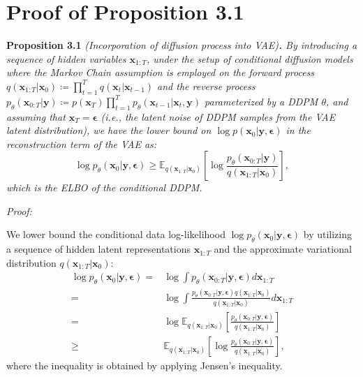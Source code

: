 \section{Proof of Proposition 3.1}
\label{sec: appendix proof prop 1}
\noindent\textbf{Proposition 3.1} 
\textit{
    (Incorporation of diffusion process into VAE)\textbf{.}
    By introducing a sequence of hidden variables $\mathbf{x}_{1:T}$, under the setup of conditional diffusion models where the Markov Chain assumption is employed on the forward process $q(\mathbf{x}_{1:T}|\mathbf{x}_0)\coloneq\prod_{t=1}^Tq(\mathbf{x}_t|\mathbf{x}_{t-1})$ and the reverse process $p_\theta(\mathbf{x}_{0:T}|\mathbf{y})\coloneq p(\mathbf{x}_T)\prod_{t=1}^Tp_\theta(\mathbf{x}_{t-1}|\mathbf{x}_t,\mathbf{y})$ parameterized by a DDPM $\theta$, and assuming that $\mathbf{x}_T=\boldsymbol{\epsilon}$ (i.e., the latent noise of DDPM samples from the VAE latent distribution), we have the lower bound on $\log p(\mathbf{x}_0|\mathbf{y},\boldsymbol{\epsilon})$ in the reconstruction term of the VAE as:
    \begin{equation*}
        \log p_\theta(\mathbf{x}_0|\mathbf{y},\boldsymbol{\epsilon})\geq\mathbb{E}_{q(\mathbf{x}_{1:T}|\mathbf{x}_0)}\left[\log\frac{p_\theta({\mathbf{x}_{0:T}}|\mathbf{y})}{q(\mathbf{x}_{1:T}|\mathbf{x}_0)}\right],
    \end{equation*}
    which is the ELBO of the conditional DDPM. 
}

\vspace{0.25cm}

\textit{Proof:}

We lower bound the conditional data log-likelihood $\log p_\theta(\mathbf{x}_0|\mathbf{y},\boldsymbol{\epsilon})$ by utilizing a sequence of hidden latent representations $\mathbf{x}_{1:T}$ and the approximate variational distribution $q(\mathbf{x}_{1:T}|\mathbf{x}_0)$:
\begin{equation}
\begin{aligned}
    \log p_\theta(\mathbf{x}_0|\mathbf{y},\boldsymbol{\epsilon})=&\log\int p_\theta(\mathbf{x}_{0:T}|\mathbf{y},\boldsymbol{\epsilon})d\mathbf{x}_{1:T} \\
    =&\log\int \frac{p_\theta(\mathbf{x}_{0:T}|\mathbf{y},\boldsymbol{\epsilon})q(\mathbf{x}_{1:T}|\mathbf{x}_0)}{q(\mathbf{x}_{1:T}|\mathbf{x}_0)}d\mathbf{x}_{1:T} \\
    =&\log\mathbb{E}_{q(\mathbf{x}_{1:T}|\mathbf{x}_0)}\left[\frac{p_\theta({\mathbf{x}_{0:T}}|\mathbf{y},\boldsymbol{\epsilon})}{q(\mathbf{x}_{1:T}|\mathbf{x}_0)}\right] \\
    \geq&\mathbb{E}_{q(\mathbf{x}_{1:T}|\mathbf{x}_0)}\left[\log\frac{p_\theta({\mathbf{x}_{0:T}}|\mathbf{y},\boldsymbol{\epsilon})}{q(\mathbf{x}_{1:T}|\mathbf{x}_0)}\right],
\label{eq: cddpm lower bound appendix}
\end{aligned}
\end{equation}
where the inequality is obtained by applying Jensen’s inequality.

